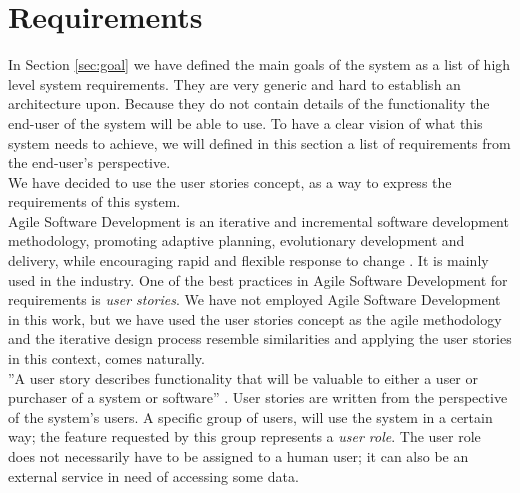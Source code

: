 \section{Requirements} %
\label{sec:requirements}
In Section \ref{sec:goal} we have defined the main goals of the system as a list of high level system requirements. They are very generic and hard to establish an architecture upon. Because they do not contain details of the functionality the end-user of the system will be able to use. To have a clear vision of what this system needs to achieve, we will defined in this section a list of requirements from the end-user's perspective.\\

We have decided to use the user stories concept, as a way to express the requirements of this system.\\

Agile Software Development is an iterative and incremental software development methodology, promoting adaptive planning, evolutionary development and delivery, while encouraging rapid and flexible response to change \cite{agile:online}. It is mainly used in the industry. One of the best practices in Agile Software Development for requirements is \emph{user stories}. We have not employed Agile Software Development in this work, but we have used the user stories concept as the agile methodology and the iterative design process resemble similarities and applying the user stories in this context, comes naturally.\\

''A user story describes functionality that will be valuable to either a user or purchaser of a system or software'' \cite{cohn2004user}. User stories are written from the perspective of the system's users. A specific group of users, will use the system in a certain way; the feature requested by this group represents a \emph{user role}. The user role does not necessarily have to be assigned to a human user; it can also be an external service in need of accessing some data.\\

